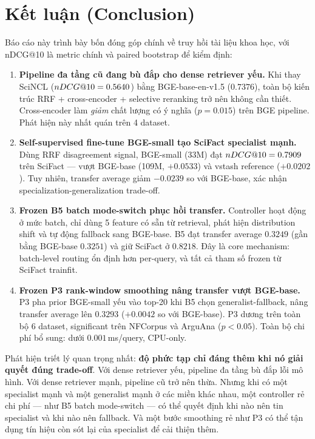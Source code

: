 \section{Kết luận (Conclusion)}
\label{sec:conclusion}

Báo cáo này trình bày bốn đóng góp chính về truy hồi tài liệu khoa học, với nDCG@10 là metric chính và
paired bootstrap để kiểm định:

\begin{enumerate}[leftmargin=2em,itemsep=3pt]
  \item \textbf{Pipeline đa tầng cũ đang bù đắp cho dense retriever yếu.} Khi thay SciNCL ($nDCG@10 =
  0.5640$) bằng BGE-base-en-v1.5 ($0.7376$), toàn bộ kiến trúc RRF + cross-encoder + selective
  reranking trở nên không cần thiết. Cross-encoder làm \emph{giảm} chất lượng có ý nghĩa ($p=0.015$)
  trên BGE pipeline. Phát hiện này nhất quán trên 4 dataset.

  \item \textbf{Self-supervised fine-tune BGE-small tạo SciFact specialist mạnh.} Dùng RRF disagreement
  signal, BGE-small (33M) đạt $nDCG@10 = 0.7909$ trên SciFact --- vượt BGE-base (109M, $+0.0533$) và
  vstash reference ($+0.0202$). Tuy nhiên, transfer average giảm $-0.0239$ so với BGE-base, xác nhận
  specialization-generalization trade-off.

  \item \textbf{Frozen B5 batch mode-switch phục hồi transfer.} Controller hoạt động ở mức batch, chỉ
  dùng 5 feature có sẵn từ retrieval, phát hiện distribution shift và tự động fallback sang BGE-base.
  B5 đạt transfer average $0.3249$ (gần bằng BGE-base $0.3251$) và giữ SciFact ở $0.8218$. Đây là core
  mechanism: batch-level routing ổn định hơn per-query, và tất cả tham số frozen từ SciFact trainfit.

  \item \textbf{Frozen P3 rank-window smoothing nâng transfer vượt BGE-base.} P3 pha prior BGE-small
  yếu vào top-20 khi B5 chọn generalist-fallback, nâng transfer average lên $0.3293$ ($+0.0042$ so với
  BGE-base). P3 dương trên toàn bộ 6 dataset, significant trên NFCorpus và ArguAna ($p<0.05$). Toàn
  bộ chi phí bổ sung: dưới $0.001$\,ms/query, CPU-only.
\end{enumerate}

Phát hiện triết lý quan trọng nhất: \textbf{độ phức tạp chỉ đáng thêm khi nó giải quyết đúng trade-off}.
Với dense retriever yếu, pipeline đa tầng bù đắp lỗi mô hình. Với dense retriever mạnh, pipeline cũ trở
nên thừa. Nhưng khi có một specialist mạnh và một generalist mạnh ở các miền khác nhau, một controller
rẻ chi phí --- như B5 batch mode-switch --- có thể quyết định khi nào nên tin specialist và khi nào nên
fallback. Và một bước smoothing rẻ như P3 có thể tận dụng tín hiệu còn sót lại của specialist để cải
thiện thêm.


